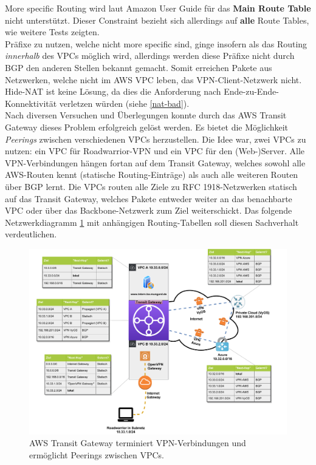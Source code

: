 More specific Routing wird laut Amazon User Guide für das \textbf{Main Route Table} nicht unterstützt\cite[S.230]{awsug2020}. Dieser Constraint bezieht sich allerdings auf \textbf{alle} Route Tables, wie weitere Tests zeigten.\\
Präfixe zu nutzen, welche nicht more specific sind, ginge insofern als das Routing \textit{innerhalb} des VPCs möglich wird, allerdings werden diese Präfixe nicht durch BGP den anderen Stellen bekannt gemacht. Somit erreichen Pakete aus Netzwerken, welche nicht im AWS VPC \glqq leben\grqq{}, das VPN-Client-Netzwerk nicht.\\
Hide-NAT ist keine Lösung, da dies die Anforderung nach Ende-zu-Ende-Konnektivität verletzen würden (siehe \ref{nat-bad}).\\
Nach diversen Versuchen und Überlegungen konnte durch das AWS Transit Gateway dieses Problem erfolgreich gelöst werden. Es bietet die Möglichkeit \textit{Peerings} zwischen verschiedenen VPCs herzustellen. Die Idee war, zwei VPCs zu nutzen: ein VPC für Roadwarrior-VPN und ein VPC für den (Web-)Server. Alle VPN-Verbindungen hängen fortan auf dem Transit Gateway, welches sowohl alle AWS-Routen kennt (statische Routing-Einträge) als auch alle weiteren Routen über BGP lernt. Die VPCs routen alle Ziele zu RFC 1918-Netzwerken statisch auf das Transit Gateway, welches Pakete entweder weiter an das benachbarte VPC oder über das Backbone-Netzwerk zum Ziel weiterschickt. Das folgende Netzwerkdiagramm \ref{grafik:aws_tgw_route_tables} mit anhängigen Routing-Tabellen soll diesen Sachverhalt verdeutlichen.
\begin{figure}[h]
  \centering
  \includegraphics[scale=0.75]{Figures/Use-Case-2_AWS_TGW_Route-Tables.pdf}
  \caption{AWS Transit Gateway terminiert VPN-Verbindungen und ermöglicht Peerings zwischen VPCs.}
  \label{grafik:aws_tgw_route_tables}
\end{figure}\FloatBarrier
